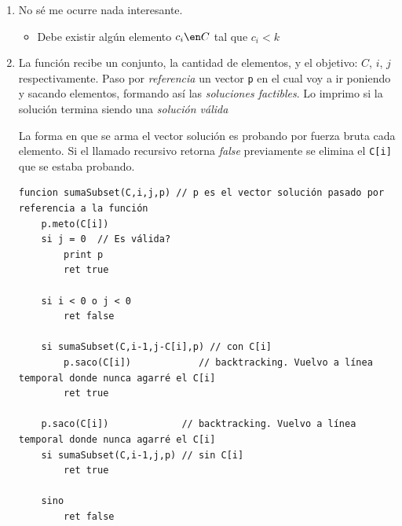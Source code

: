 \begin{enumerate}[label=$\alph*)$]
        Cualquier llamada recursiva a $\green{sumaSubset}$ que tenga en su tercer argumento algo negativo
        , eso corta una \textit{subrama} del
        árbol, es decir que \textit{se podó el árbol   get it?}

  \item
        No sé me ocurre nada interesante.
        \begin{itemize}
          \item Debe existir algún elemento  $c_i \en C$ tal que $c_i < k$
        \end{itemize}

  \item La función recibe un conjunto, la cantidad de elementos, y el objetivo: $C$, $i$, $j$ respectivamente.
        Paso por \textit{referencia} un vector \texttt{p} en el cual voy a ir poniendo y sacando elementos, formando así
        las \textit{soluciones factibles}. Lo imprimo si la solución termina siendo una \textit{solución válida}

        La forma en que se arma el vector solución es probando por fuerza bruta cada elemento. Si el llamado recursivo retorna \textit{false}
        previamente se elimina el \texttt{C[i]} que se estaba probando.
        \begin{tcolorbox}
          \begin{lstlisting}
funcion sumaSubset(C,i,j,p) // p es el vector solución pasado por referencia a la función
    p.meto(C[i])
    si j = 0  // Es válida?
        print p
        ret true

    si i < 0 o j < 0
        ret false

    si sumaSubset(C,i-1,j-C[i],p) // con C[i]
        p.saco(C[i])            // backtracking. Vuelvo a línea temporal donde nunca agarré el C[i]
        ret true

    p.saco(C[i])             // backtracking. Vuelvo a línea temporal donde nunca agarré el C[i]
    si sumaSubset(C,i-1,j,p) // sin C[i]
        ret true

    sino
        ret false \end{lstlisting}
        \end{tcolorbox}
\end{enumerate}
\fin
